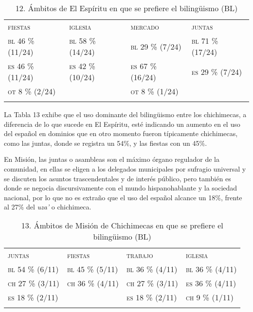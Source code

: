 \documentclass[output=paper]{../langscibook}
\begin{document}
\begin{table}
\caption{\label{tab:guerrero}12. Ámbitos de El Espíritu en que se prefiere el bilingüismo (BL)}
\begin{tabularx}{\textwidth}{XXXX}
\lsptoprule
\textsc{fiestas} & {\textsc{iglesia}} & {\textsc{mercado}} & {\textsc{juntas}}\\
{\textsc{bl} \textsc{46} \textsc{\%} \textsc{(11/24)}} & {\textsc{bl} \textsc{58} \textsc{\%} \textsc{(14/24)}} & {\textsc{bl} \textsc{29} \textsc{\%} \textsc{(7/24)}} & {\textsc{bl} \textsc{71} \textsc{\%} \textsc{(17/24)}}\\
{\textsc{es} \textsc{46} \textsc{\%} \textsc{(11/24)}} & {\textsc{es} \textsc{42} \textsc{\%} \textsc{(10/24)}} & {\textsc{es} \textsc{67} \textsc{\%} \textsc{(16/24)}} & {\textsc{es} \textsc{29} \textsc{\%} \textsc{(7/24)}}\\
{\textsc{ot} \textsc{8} \textsc{\%} \textsc{(2/24)}} &  & {\textsc{ot} \textsc{8} \textsc{\%} \textsc{(1/24)}} & \\
\lspbottomrule
\end{tabularx}
\end{table}

La Tabla 13 exhibe que el uso dominante del bilingüismo entre los chichimecas, a diferencia de lo que sucede en El Espíritu, esté indicando un aumento en el uso del español en dominios que en otro momento fueron típicamente chichimecas, como las juntas, donde se registra un 54\%, y las fiestas con un 45\%.

  En Misión, las juntas o asambleas son el máximo órgano regulador de la comunidad, en ellas se eligen a los delegados municipales por sufragio universal y se discuten los asuntos trascendentales y de interés público, pero también es donde se negocia discursivamente con el mundo hispanohablante y la sociedad nacional, por lo que no es extraño que el uso del español alcance un 18\%, frente al 27\% del \textit{uza’} o chichimeca.

\begin{table}
\caption{\label{tab:guerrero}13. Ámbitos de Misión de Chichimecas en que se prefiere el bilingüismo (BL)}


\begin{tabularx}{\textwidth}{XXXX}
\lsptoprule
{\textsc{juntas}} & {\textsc{fiestas}} & {\textsc{trabajo}} & {\textsc{iglesia}}\\
{\textsc{bl} \textsc{54} \textsc{\%} \textsc{(6/11)}} & {\textsc{bl} \textsc{45} \textsc{\%} \textsc{(5/11)}} & {\textsc{bl} \textsc{36} \textsc{\%} \textsc{(4/11)}} & {\textsc{bl} \textsc{36} \textsc{\%} \textsc{(4/11)}}\\
{\textsc{ch} \textsc{27} \textsc{\%} \textsc{(3/11)}} & {\textsc{ch} \textsc{36} \textsc{\%} \textsc{(4/11)}} & {\textsc{ch} \textsc{27} \textsc{\%} \textsc{(3/11)}} & {\textsc{es} \textsc{36} \textsc{\%} \textsc{(4/11)}}\\
{\textsc{es} \textsc{18} \textsc{\%} \textsc{(2/11)}} &  & {\textsc{es} \textsc{18} \textsc{\%} \textsc{(2/11)}} & {\textsc{ch} \textsc{9} \textsc{\%} \textsc{(1/11)}}\\
\lspbottomrule
\end{tabularx}
\end{table}
\end{document}
